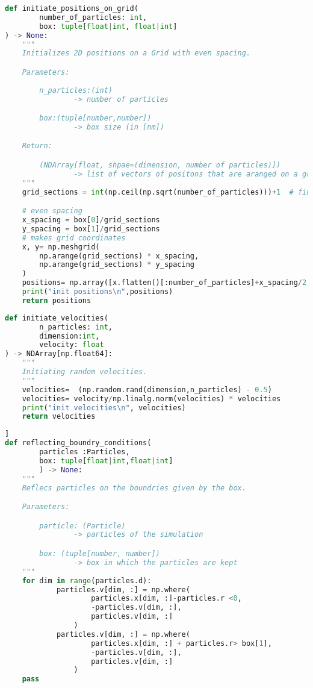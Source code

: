 \documentclass{article}[a4paper]
\begin{document}
\begin{lstlisting}[language=python]
def initiate_positions_on_grid(
        number_of_particles: int,
        box: tuple[float|int, float|int]
) -> None:
    """
    Initializes 2D positions on a Grid with even spacing.

    Parameters:
                
        n_particles:(int)
                -> number of particles

        box:(tuple[number,number]) 
                -> box size (in [nm])

    Return:

        (NDArray[float, shpae=(dimension, number of particles)])
                -> list of vectors of positons that are aranged on a grid
    """
    grid_sections = int(np.ceil(np.sqrt(number_of_particles)))+1  # find the number of colums & rows

    # even spacing
    x_spacing = box[0]/grid_sections 
    y_spacing = box[1]/grid_sections
    # makes grid coordinates
    x, y= np.meshgrid(
        np.arange(grid_sections) * x_spacing, 
        np.arange(grid_sections) * y_spacing
    )
    positions= np.array([x.flatten()[:number_of_particles]+x_spacing/2, y.flatten()[:number_of_particles]+y_spacing/2])
    print("init positions\n",positions)  
    return positions
\end{lstlisting}

\begin{lstlisting}[language=python]
def initiate_velocities(
        n_particles: int,
        dimension:int,
        velocity: float
) -> NDArray[np.float64]:
    """
    Initiating random velocities.
    """
    velocities=  (np.random.rand(dimension,n_particles) - 0.5)
    velocities= velocity/np.linalg.norm(velocities) * velocities
    print("init velocities\n", velocities)
    return velocities
\end{lstlisting}

\begin{lstlisting}[language=python]]
def reflecting_boundry_conditions(
        particles :Particles,
        box: tuple[float|int,float|int]
        ) -> None:
    """
    Reflecs particles on the boundries given by the box.

    Parameters:

        particle: (Particle)
                -> particles of the simulation

        box: (tuple[number, number])
                -> box in which the particles are kept 
    """
    for dim in range(particles.d):
            particles.v[dim, :] = np.where(
                    particles.x[dim, :]-particles.r <0,
                    -particles.v[dim, :],
                    particles.v[dim, :]
                )
            particles.v[dim, :] = np.where(
                    particles.x[dim, :] + particles.r> box[1],
                    -particles.v[dim, :],
                    particles.v[dim, :]
                )
    pass
\end{lstlisting}
\end{document}
